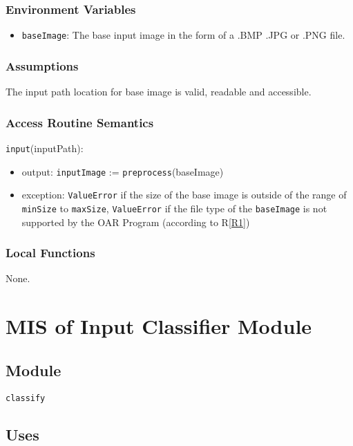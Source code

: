 \documentclass[12pt, titlepage]{article}
\def\code#1{\texttt{#1}}
\begin{document}
\subsubsection{Environment Variables}

\begin{itemize}
  \item \code{baseImage}: The base input image in the form of a .BMP .JPG or .PNG file.
\end{itemize}

\subsubsection{Assumptions}

The input path location for base image is valid, readable and accessible.

\subsubsection{Access Routine Semantics}

\noindent \code{input}(inputPath):
\begin{itemize}
\item output: \code{inputImage} := \code{preprocess}(baseImage) 
\item exception: \code{ValueError} if the size of the base image is outside of the range of 
\code{minSize} to \code{maxSize}, \code{ValueError} if the file type of the \code{baseImage} is not 
supported by the OAR Program (according to R\ref{R1})
\end{itemize}

\subsubsection{Local Functions}

None.


\section{MIS of Input Classifier Module} \label{ModuleIC} 

\subsection{Module}

\code{classify}

\subsection{Uses}
\end{document}
